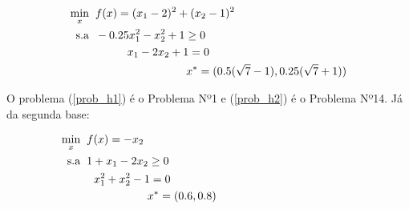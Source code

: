 
\vspace{-0.5cm}

\begin{subequations}
  \label{prob_h2}
  \begin{align}
    \hspace{0pt}\hfill \underset{x}{\text{min}} \hspace{0.2cm} & f(x) =   (x_1 - 2)^2 + (x_2-1)^2 \\
    \hspace{0pt}\hfill \text{s.a} \hspace{0.2cm} & -0.25x_1^2 - x_2^2 + 1 \geq 0 \\
    \hspace{0pt}\hfill & \hspace{1cm} x_1 - 2x_2 + 1 = 0 \\
    \hspace{0pt}\hfill & \hspace{2.85cm} x^* = (0.5(\sqrt{7}-1), 0.25(\sqrt{7}+1))
  \end{align}
\end{subequations}








O problema (\ref{prob_h1}) é o Problema Nº1 e (\ref{prob_h2}) é o Problema Nº14.
Já da segunda base:

\begin{subequations}
  \label{prob_s1}
  \begin{align}
    \hspace{0pt}\hfill \underset{x}{\text{min}} \hspace{0.2cm} & f(x) = -x_2 \hspace{4.35cm} \\
    \hspace{0pt}\hfill \text{s.a} \hspace{0.2cm} &  1 + x_1 - 2x_2 \geq 0 \hspace{4.35cm} \\
    \hspace{0pt}\hfill & \hspace{0.225cm}  x_1^2 + x_2^2 - 1 = 0 \hspace{4.35cm} \\
    \hspace{0pt}\hfill & \hspace{1.9cm} x^* = (0.6, 0.8) \hspace{4.35cm}
  \end{align}
\end{subequations}


